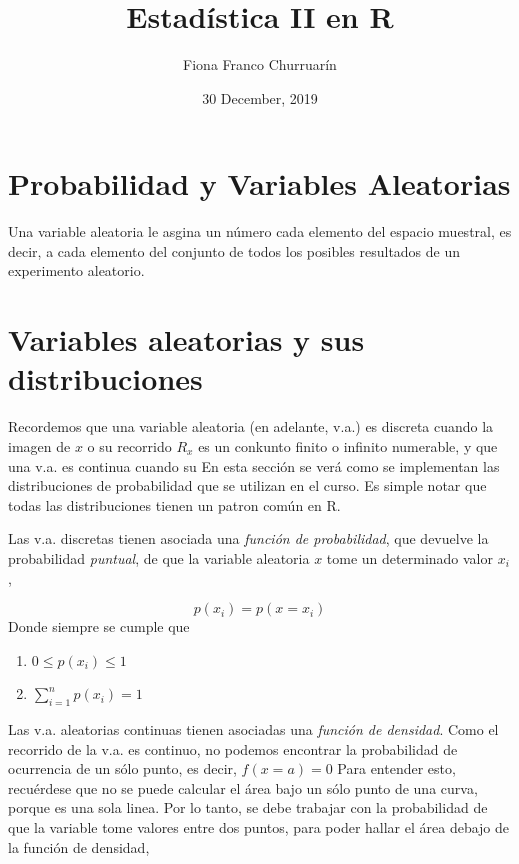 \documentclass[]{article}
\title{Estadística II en R}
\author{Fiona Franco Churruarín}
\date{30 December, 2019}
\begin{document}
\maketitle

{
\setcounter{tocdepth}{2}
\tableofcontents
}
\pagebreak

\hypertarget{probabilidad-y-variables-aleatorias}{%
\section{Probabilidad y Variables
Aleatorias}\label{probabilidad-y-variables-aleatorias}}

Una variable aleatoria le asgina un número cada elemento del espacio
muestral, es decir, a cada elemento del conjunto de todos los posibles
resultados de un experimento aleatorio.

\hypertarget{variables-aleatorias-y-sus-distribuciones}{%
\section{Variables aleatorias y sus
distribuciones}\label{variables-aleatorias-y-sus-distribuciones}}

Recordemos que una variable aleatoria (en adelante, v.a.) es discreta
cuando la imagen de \(x\) o su recorrido \(R_x\) es un conkunto finito o
infinito numerable, y que una v.a. es continua cuando su En esta sección
se verá como se implementan las distribuciones de probabilidad que se
utilizan en el curso. Es simple notar que todas las distribuciones
tienen un patron común en R.

Las v.a. discretas tienen asociada una \emph{función de probabilidad},
que devuelve la probabilidad \emph{puntual}, de que la variable
aleatoria \(x\) tome un determinado valor \(x_i\),

\[p(x_i) = p(x=x_i)\] Donde siempre se cumple que

\begin{enumerate}
\def\labelenumi{\arabic{enumi}.}
\item
  \(0 \leq p(x_i) \leq 1\)
\item
  \(\sum_{i=1}^n p(x_i)= 1\)
\end{enumerate}

Las v.a. aleatorias continuas tienen asociadas una \emph{función de
densidad}. Como el recorrido de la v.a. es continuo, no podemos
encontrar la probabilidad de ocurrencia de un sólo punto, es decir,
\(f(x=a)=0\) Para entender esto, recuérdese que no se puede calcular el
área bajo un sólo punto de una curva, porque es una sola linea. Por lo
tanto, se debe trabajar con la probabilidad de que la variable tome
valores entre dos puntos, para poder hallar el área debajo de la función
de densidad,
\end{document}
